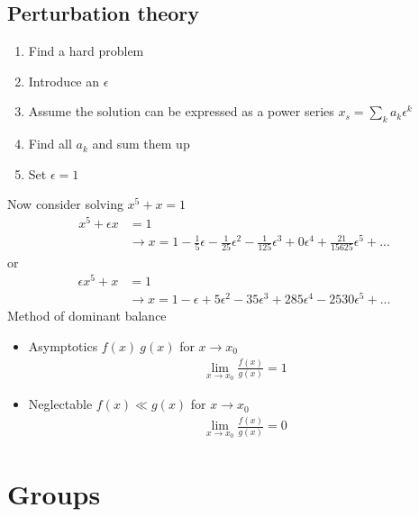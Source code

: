 \documentclass[10pt,a4paper]{book}
\theoremstyle{definition}
\begin{document}
\section{Perturbation theory}

\begin{enumerate}
\item Find a hard problem
\item Introduce an $\epsilon$
\item Assume the solution can be expressed as a power series $x_s=\sum_k a_k\epsilon^k$
\item Find all $a_k$ and sum them up
\item Set $\epsilon=1$
\end{enumerate}
Now consider solving $x^5+x=1$
\begin{align}
x^5+\epsilon x&=1\\
&\rightarrow x=1-\frac{1}{5}\epsilon-\frac{1}{25}\epsilon^2-\frac{1}{125}\epsilon^3+0\epsilon^4+\frac{21}{15625}\epsilon^5+...
\end{align}
or
\begin{align}
\epsilon x^5+x&=1\\
&\rightarrow x=1-\epsilon+5\epsilon^2-35\epsilon^3+285\epsilon^4-2530\epsilon^5+...
\end{align}
Method of dominant balance

\begin{itemize}
\item Asymptotics $f(x)~g(x)$ for $x\rightarrow x_0$ 
\begin{align}
\lim_{x\rightarrow x_0}\frac{f(x)}{g(x)}=1
\end{align}
\item Neglectable $f(x)\ll g(x)$ for $x\rightarrow x_0$ 
\begin{align}
\lim_{x\rightarrow x_0}\frac{f(x)}{g(x)}=0
\end{align}
\end{itemize}



\chapter{Groups}
\end{document}
